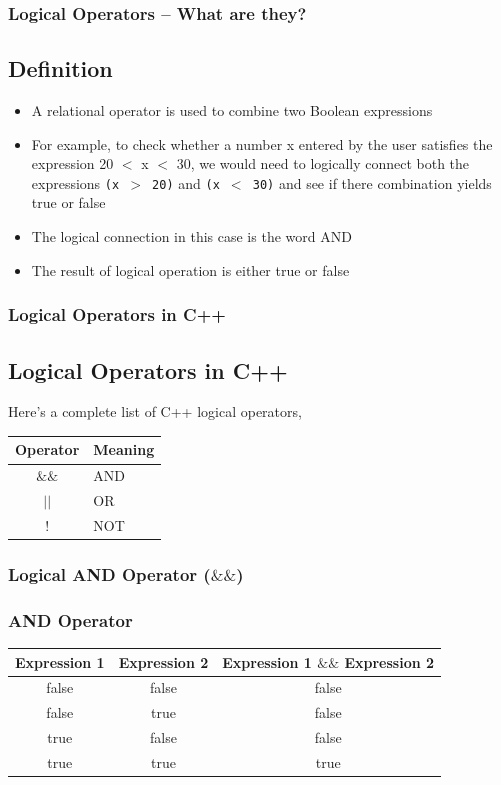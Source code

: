 \documentclass{beamer}
\begin{document}
\begin{frame}
    \frametitle{Logical Operators -- What are they?}
    \subsection{Definition} %
    \label{sub:definition_2}
    \begin{itemize}
        \item A relational operator is used to combine two Boolean expressions
        \item For example, to check whether a number x entered by the user satisfies the expression 20 $<$ x $<$ 30, we would need to logically connect both the expressions \texttt{(x $>$ 20)} and \texttt{(x $<$ 30)} and see if there combination yields true or false
        \item The logical connection in this case is the word AND
        \item The result of logical operation is either true or false
    \end{itemize}
\end{frame}

\begin{frame}
    \frametitle{Logical Operators in C++}
    \subsection{Logical Operators in C++} %
    \label{sub:a_complete_list_2}
    Here's a complete list of C++ logical operators,
    \begin{table}
        \begin{tabular}{c | l}
        Operator & Meaning \\
        \hline \hline
        $\&\&$ & AND \\
        $||$ & OR\\
        $!$ & NOT
        \end{tabular}
    \end{table}
\end{frame}

\begin{frame}
    \frametitle{Logical AND Operator ($\&\&$)}
    \subsubsection{AND Operator} %
    \label{ssub:and_operator}
    \begin{table}
        \begin{tabular}{c | c | c}
        Expression 1 & Expression 2 & Expression 1 $\&\&$ Expression 2 \\
        \hline \hline
        false & false & false\\
        false & true & false\\
        true & false & false\\
        true & true & true
        \end{tabular}
    \end{table}
\end{frame}
\end{document}
